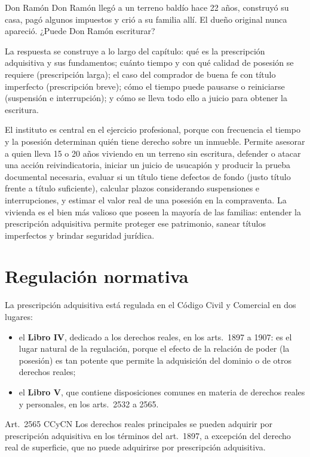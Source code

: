 \documentclass[12pt,oneside]{book}
\begin{document}
\begin{ejemplo}{Don Ramón}
Don Ramón llegó a un terreno baldío hace 22 años, construyó su casa, pagó algunos impuestos y crió a su familia allí. El dueño original nunca apareció. ¿Puede Don Ramón escriturar?

La respuesta se construye a lo largo del capítulo: qué es la prescripción adquisitiva y sus fundamentos; cuánto tiempo y con qué calidad de posesión se requiere (prescripción larga); el caso del comprador de buena fe con título imperfecto (prescripción breve); cómo el tiempo puede pausarse o reiniciarse (suspensión e interrupción); y cómo se lleva todo ello a juicio para obtener la escritura.
\end{ejemplo}

El instituto es central en el ejercicio profesional, porque con frecuencia el tiempo y la posesión determinan quién tiene derecho sobre un inmueble. Permite asesorar a quien lleva 15 o 20 años viviendo en un terreno sin escritura, defender o atacar una acción reivindicatoria, iniciar un juicio de usucapión y producir la prueba documental necesaria, evaluar si un título tiene defectos de fondo (justo título frente a título suficiente), calcular plazos considerando suspensiones e interrupciones, y estimar el valor real de una posesión en la compraventa. La vivienda es el bien más valioso que poseen la mayoría de las familias: entender la prescripción adquisitiva permite proteger ese patrimonio, sanear títulos imperfectos y brindar seguridad jurídica.

\section{Regulación normativa}

La prescripción adquisitiva está regulada en el Código Civil y Comercial en dos lugares:

\begin{itemize}
    \item el \textbf{Libro IV}, dedicado a los derechos reales, en los arts.~1897 a 1907: es el lugar natural de la regulación, porque el efecto de la relación de poder (la posesión) es tan potente que permite la adquisición del dominio o de otros derechos reales;
    \item el \textbf{Libro V}, que contiene disposiciones comunes en materia de derechos reales y personales, en los arts.~2532 a 2565.
\end{itemize}

\begin{regla}{Art.~2565 CCyCN}
Los derechos reales principales se pueden adquirir por prescripción adquisitiva en los términos del art.~1897, a excepción del derecho real de superficie, que no puede adquirirse por prescripción adquisitiva.
\end{regla}
\end{document}
